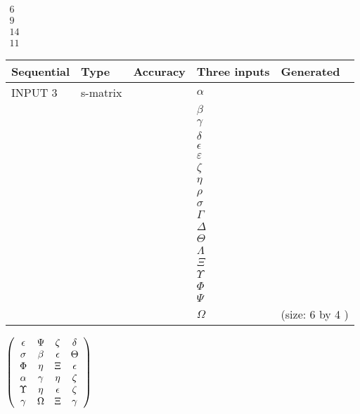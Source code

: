 \documentclass[12pt]{article}
\begin{document}
   
 $\begin{array}{
 c
 }
 6  \\ 
 9  \\ 
 14  \\ 
 11
\end{array}  $ 
  
  
\noindent\begin{tabular}{|l|l|l|l|l|}
\hline
 Sequential & Type & Accuracy & Three inputs & Generated \\ 
\hline
 
 
  INPUT $  3 $ & s-matrix & & 
 $  \alpha $ & 
  \\
  & & & 
 $  \beta $ & 
  \\
  & & & 
 $  \gamma $ & 
  \\
  & & & 
 $  \delta $ & 
  \\
  & & & 
 $  \epsilon $ & 
  \\
  & & & 
 $  \varepsilon $ & 
  \\
  & & & 
 $                     \zeta $ & 
  \\
  & & & 
 $  \eta $ & 
  \\
  & & & 
 $  \rho $ & 
  \\
  & & & 
 $  \sigma $ & 
  \\
  & & & 
 $  \Gamma $ & 
  \\
  & & & 
 $  \Delta $ & 
  \\
  & & & 
 $  \Theta $ & 
  \\
  & & & 
 $  \Lambda $ & 
  \\
  & & & 
 $                     \Xi $ & 
  \\
  & & & 
 $  \Upsilon $ & 
  \\
  & & & 
 $  \Phi $ & 
  \\
  & & & 
 $  \Psi $ & 
  \\
  & & & 
 $  \Omega $ & 
  (size:  6  by  4 )
 \\  \hline  
 \end{tabular}
   
   
 $  \left( \begin{array}
 {
 c
 c
 c
 c
 }
 \epsilon & 
 \Psi & 
                    \zeta & 
 \delta \\ 
 \sigma & 
 \beta & 
 \epsilon & 
 \Theta \\ 
 \Phi & 
 \eta & 
                    \Xi & 
 \epsilon \\ 
 \alpha & 
 \gamma & 
 \eta & 
                    \zeta \\ 
 \Upsilon & 
 \eta & 
 \epsilon & 
                    \zeta \\ 
 \gamma & 
 \Omega & 
                    \Xi & 
 \gamma
 \end{array} \right) $ 
  
\end{document}
